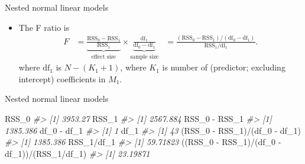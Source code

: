\documentclass[
  10pt,
  ignorenonframetext,
]{beamer}
\newenvironment{Shaded}{\begin{snugshade}}{\end{snugshade}}
\newcommand{\CommentTok}[1]{\textcolor[rgb]{0.56,0.35,0.01}{\textit{#1}}}
\newcommand{\FunctionTok}[1]{\textcolor[rgb]{0.00,0.00,0.00}{#1}}
\newcommand{\NormalTok}[1]{#1}
\newcommand{\OtherTok}[1]{\textcolor[rgb]{0.56,0.35,0.01}{#1}}
\newcommand{\SpecialCharTok}[1]{\textcolor[rgb]{0.00,0.00,0.00}{#1}}
\providecommand{\tightlist}{%
  \setlength{\itemsep}{0pt}\setlength{\parskip}{0pt}}
\begin{document}
\begin{frame}[fragile]{Nested normal linear models}
\protect\hypertarget{nested-normal-linear-models-2}{}
\begin{itemize}
\tightlist
\item
  The F ratio is \[
  \begin{aligned}
  F &= \underbrace{\frac{\text{RSS}_0 - \text{RSS}_1}{\text{RSS}_1}}_{\text{effect size}} \times \underbrace{\frac{\text{df}_1}{\text{df}_0 - \text{df}_1}}_{\text{sample size}}
  &= \frac{(\text{RSS}_0 - \text{RSS}_1)/(\text{df}_0 - \text{df}_1)}{\text{RSS}_1/\text{df}_1}.
  \end{aligned}
  \] where \(\text{df}_1\) is \(N - (K_1 + 1)\), where \(K_1\) is number
  of (predictor; excluding intercept) coefficients in \(M_1\).
\end{itemize}

\begin{Shaded}
\end{Shaded}
\end{frame}

\begin{frame}[fragile]{Nested normal linear models}
\protect\hypertarget{nested-normal-linear-models-3}{}
\begin{Shaded}
\begin{Highlighting}[]
\NormalTok{RSS\_0}
\CommentTok{\#\textgreater{} [1] 3953.27}
\NormalTok{RSS\_1}
\CommentTok{\#\textgreater{} [1] 2567.884}
\NormalTok{RSS\_0 }\SpecialCharTok{{-}}\NormalTok{ RSS\_1}
\CommentTok{\#\textgreater{} [1] 1385.386}
\NormalTok{df\_0 }\SpecialCharTok{{-}}\NormalTok{ df\_1}
\CommentTok{\#\textgreater{} [1] 1}
\NormalTok{df\_1}
\CommentTok{\#\textgreater{} [1] 43}
\NormalTok{(RSS\_0 }\SpecialCharTok{{-}}\NormalTok{ RSS\_1)}\SpecialCharTok{/}\NormalTok{(df\_0 }\SpecialCharTok{{-}}\NormalTok{ df\_1)}
\CommentTok{\#\textgreater{} [1] 1385.386}
\NormalTok{RSS\_1}\SpecialCharTok{/}\NormalTok{df\_1}
\CommentTok{\#\textgreater{} [1] 59.71823}
\NormalTok{((RSS\_0 }\SpecialCharTok{{-}}\NormalTok{ RSS\_1)}\SpecialCharTok{/}\NormalTok{(df\_0 }\SpecialCharTok{{-}}\NormalTok{ df\_1))}\SpecialCharTok{/}\NormalTok{(RSS\_1}\SpecialCharTok{/}\NormalTok{df\_1)}
\CommentTok{\#\textgreater{} [1] 23.19871}
\end{Highlighting}
\end{Shaded}
\end{frame}
\end{document}
